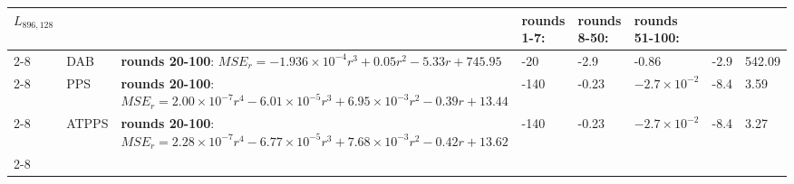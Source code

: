 \begin{table}[]
\begin{adjustbox}
\begin{tabular}{|p{0.8cm}|p{1cm}|p{10cm}|p{1.2cm}|p{1.2cm}|p{1.2cm}|p{1cm}|p{1cm}|}
\hline
\multicolumn{1}{|l|}{\multirow{3}{*}{$L_{896,128}$}} &  &  & \textbf{rounds 1-7}:& \textbf{rounds 8-50}: & \textbf{rounds 51-100}:  & & \\ \cline{2-8}
\multicolumn{1}{|c|}{} & DAB & \textbf{rounds 20-100}: $MSE_r=-1.936\times 10^{-4}r^{3}+0.05r^{2}-5.33r+745.95$ & -20& -2.9 &-0.86 & -2.9  & 542.09 \\ \cline{2-8} 
\multicolumn{1}{|l|}{} & PPS & \textbf{rounds 20-100}:$MSE_r=2.00\times 10^{-7}r^{4}-6.01\times 10^{-5}r^{3}+6.95\times 10^{-3}r^{2}-0.39r+13.44$ & -140 & -0.23 & $-2.7 \times 10^{-2}$ & -8.4 & 3.59 \\ \cline{2-8} 
\multicolumn{1}{|l|}{} & ATPPS & \textbf{rounds 20-100}: $MSE_r=2.28\times 10^{-7}r^{4}-6.77\times 10^{-5}r^{3}+7.68\times 10^{-3}r^{2}-0.42r+13.62$ & -140 & -0.23 & $-2.7 \times 10^{-2}$ & -8.4 & 3.27\\ \cline{2-8}
\hline 
\end{tabular}
\end{adjustbox}
\end{table}